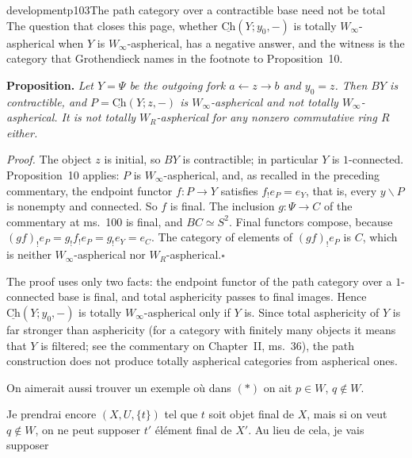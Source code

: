 \begin{dcomment}{development}{p103}{The path category over a contractible base need not be total}
The question that closes this page, whether $\underline{\mathrm{Ch}}(Y;y_0,-)$ is totally $W_\infty$-aspherical when $Y$ is $W_\infty$-aspherical, has a negative answer, and the witness is the category that Grothendieck names in the footnote to Proposition~10.

\textbf{Proposition.}\ours
\textit{Let $Y=\Psi$ be the outgoing fork $a\leftarrow z\to b$ and $y_0=z$. Then $BY$ is contractible, and $P=\underline{\mathrm{Ch}}(Y;z,-)$ is $W_\infty$-aspherical and not totally $W_\infty$-aspherical. It is not totally $W_R$-aspherical for any nonzero commutative ring $R$ either.}

\textit{Proof.}
The object $z$ is initial, so $BY$ is contractible; in particular $Y$ is $1$-connected. Proposition~10 applies: $P$ is $W_\infty$-aspherical, and, as recalled in the preceding commentary, the endpoint functor $f:P\to Y$ satisfies $f_!e_P=e_Y$, that is, every $y\backslash P$ is nonempty and connected. So $f$ is final. The inclusion $g:\Psi\to C$ of the commentary at ms.~100 is final, and $BC\simeq S^2$. Final functors compose, because $(gf)_!e_P=g_!f_!e_P=g_!e_Y=e_C$. The category of elements of $(gf)_!e_P$ is $C$, which is neither $W_\infty$-aspherical nor $W_R$-aspherical.\hfill$\square$

The proof uses only two facts: the endpoint functor of the path category over a $1$-connected base is final, and total asphericity passes to final images. Hence $\underline{\mathrm{Ch}}(Y;y_0,-)$ is totally $W_\infty$-aspherical only if $Y$ is. Since total asphericity of $Y$ is far stronger than asphericity (for a category with finitely many objects it means that $Y$ is filtered; see the commentary on Chapter~II, ms.~36), the path construction does not produce totally aspherical categories from aspherical ones.
\end{dcomment}


On aimerait aussi trouver un exemple où dans $(*)$ on ait $p \in W$, $q \notin W$.

\setcounter{footnote}{76}



Je prendrai encore $(X,U,\{t\})$ tel que $t$ soit objet final de $X$, mais si on veut $q\notin W$, on ne peut supposer $t'$ élément final de $X'$. Au lieu de cela, je vais supposer

